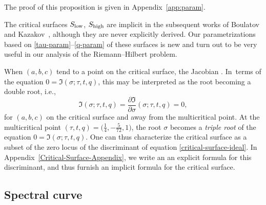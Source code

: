 \documentclass[10pt,a4paper]{amsart}
\numberwithin{equation}{section}
\begin{document}
 The proof of this proposition is given in Appendix~\ref{app:param}.

The critical surfaces $S_{{\rm low}}$, $S_{{\rm high}}$ are implicit in the subsequent works of Boulatov and Kazakov~\cite{Kazakov2}, although they are never explicitly derived. Our parametrizations based on \eqref{tau-param}--\eqref{q-param} of these surfaces is new and turn out to be very useful in our analysis of the Riemann--Hilbert problem.



\begin{Remark}
When $(a,b,c)$ tend to a point on the critical surface, the Jacobian
 . In~terms of the equation $0 = \mathfrak{I}(\sigma;\tau,t,q)$, this may be interpreted as the root  becoming a double root, i.e.,
 \begin{equation*}
 \mathfrak{I}(\sigma;\tau,t,q) = \frac{\partial \mathfrak{I} }{\partial \sigma}(\sigma;\tau,t,q) = 0,
 \end{equation*}
 for $(a,b,c)$ on the critical surface and away from the multicritical point. At the multicritical point $(\tau,t,q) = \bigl(\frac{1}{4},-\frac{5}{72},1\bigr)$, the
 root $\sigma$ becomes a \textit{triple root} of the equation $0 = \mathfrak{I}(\sigma;\tau,t,q)$. One can thus characterize the critical surface as a subset of the zero locus of the discriminant of equation \eqref{critical-surface-ideal}. In Appendix~\ref{Critical-Surface-Appendix}, we write an
 an explicit formula for this discriminant, and thus furnish an implicit formula for the critical surface.
\end{Remark}




 \subsection{Spectral curve}
\end{document}
